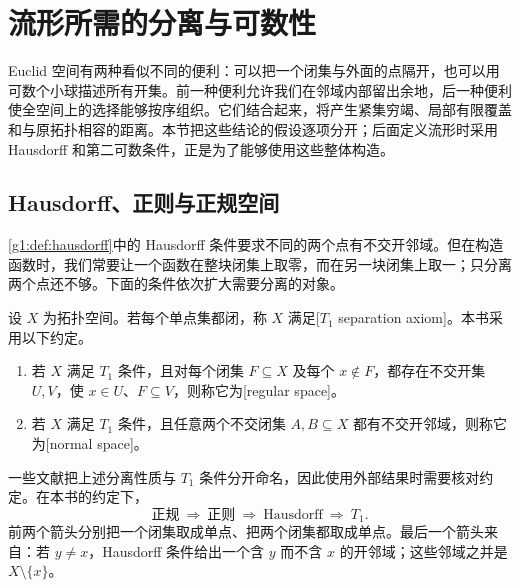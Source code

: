 
% 
% 

\section{流形所需的分离与可数性}
\label{g1:sec:0403}

Euclid 空间有两种看似不同的便利：可以把一个闭集与外面的点隔开，也可以用可数个小球描述所有开集。前一种便利允许我们在邻域内部留出余地，后一种便利使全空间上的选择能够按序组织。它们结合起来，将产生紧集穷竭、局部有限覆盖和与原拓扑相容的距离。本节把这些结论的假设逐项分开；后面定义流形时采用 Hausdorff 和第二可数条件，正是为了能够使用这些整体构造。

\subsection{Hausdorff、正则与正规空间}
\label{g1:subsec:0403:01}

\cref{g1:def:hausdorff}中的 Hausdorff 条件要求不同的两个点有不交开邻域。但在构造函数时，我们常要让一个函数在整块闭集上取零，而在另一块闭集上取一；只分离两个点还不够。下面的条件依次扩大需要分离的对象。

\begin{definition}\label{g1:def:regular-normal}
	设 \(X\) 为拓扑空间。若每个单点集都闭，称 \(X\) 满足[\(T_1\) separation axiom]。本书采用以下约定。
	\begin{enumerate}
		\item 若 \(X\) 满足 \(T_1\) 条件，且对每个闭集 \(F\subseteq X\) 及每个 \(x\notin F\)，都存在不交开集 \(U,V\)，使 \(x\in U\)、\(F\subseteq V\)，则称它为[regular space]。
		\item 若 \(X\) 满足 \(T_1\) 条件，且任意两个不交闭集 \(A,B\subseteq X\) 都有不交开邻域，则称它为[normal space]。
	\end{enumerate}
\end{definition}

一些文献把上述分离性质与 \(T_1\) 条件分开命名，因此使用外部结果时需要核对约定。在本书的约定下，
\[
	\text{正规}\ \Longrightarrow\ \text{正则}\ \Longrightarrow\ \text{Hausdorff}\ \Longrightarrow\ T_1.
\]
前两个箭头分别把一个闭集取成单点、把两个闭集都取成单点。最后一个箭头来自：若 \(y\ne x\)，Hausdorff 条件给出一个含 \(y\) 而不含 \(x\) 的开邻域；这些邻域之并是 \(X\setminus\{x\}\)。

